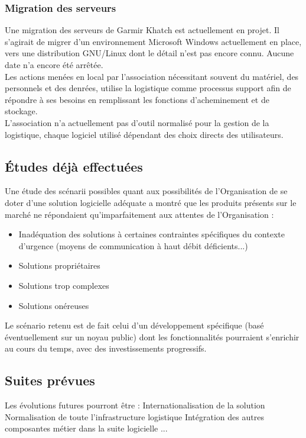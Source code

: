 \documentclass[11pt,fleqn]{book} %
\begin{document}
\subsubsection{Migration des serveurs}
Une migration des serveurs de Garmir Khatch est actuellement en projet. Il s'agirait de migrer d'un environnement Microsoft Windows actuellement en place, vers une distribution GNU/Linux dont le détail n'est pas encore connu. Aucune date n'a encore été arrêtée.
\\
Les actions menées en local par l'association nécessitant souvent du matériel, des personnels et des denrées,  utilise la logistique comme processus support afin de répondre à ses besoins en remplissant les fonctions d'acheminement et de stockage.
\\
L'association n'a actuellement pas d'outil normalisé pour la gestion de la logistique, chaque logiciel utilisé dépendant des choix directs des utilisateurs.

\subsection{Études déjà effectuées}
Une étude des scénarii possibles quant aux possibilités de l'Organisation de se doter d'une solution logicielle adéquate a montré que les produits présents sur le marché ne répondaient qu'imparfaitement aux attentes de l'Organisation :
\begin{itemize}
\item Inadéquation des solutions à certaines contraintes spécifiques du contexte d'urgence (moyens de communication à haut débit déficients...)
\item Solutions propriétaires
\item Solutions trop complexes
\item Solutions onéreuses
\end{itemize}
Le scénario retenu est de fait celui d'un développement spécifique (basé éventuellement sur un noyau public) dont les fonctionnalités pourraient s'enrichir au cours du temps, avec des investissements progressifs.

\subsection{Suites prévues}
Les évolutions futures pourront être :
Internationalisation de la solution
Normalisation de toute l'infrastructure logistique
Intégration des autres composantes métier dans la suite logicielle
...
\end{document}
